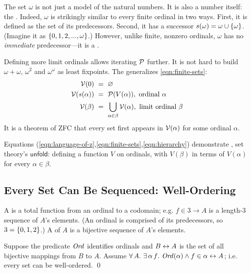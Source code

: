The set $\omega$ is not just a model of the natural numbers. It is also a number itself: the . Indeed, $\omega$ is strikingly similar to every finite ordinal in two ways. First, it is defined as the set of its predecessors. Second, it has a successor $s(\omega) = \omega \cup \{{\omega}\}$. (Imagine it as $\{{0,1,2,...,\omega}\}$.) However, unlike finite, nonzero ordinals, $\omega$ has no \emph{immediate} predecessor---it is a .

Defining more limit ordinals allows iterating $\mathcal{P}$ further. It is not hard to build $\omega + \omega$, $\omega^2$ and $\omega^\omega$ as least fixpoints. The  generalizes \eqref{eqn:finite-sets}:
\begin{equation}
\begin{aligned}
	\V(0) &\ =\ \emptyset \\
	\V(s(\alpha)) &\ =\ \powerset(V(\alpha)),\ \text{ordinal } \alpha \\
	\V(\beta) &\ =\ \bigcup_{\alpha \in \beta} \V(\alpha),\ \text{limit ordinal } \beta
\end{aligned}
\label{eqn:hierarchy}
\end{equation}
It is a theorem of ZFC that every set first appears in $\mathcal{V}(\alpha)$ for some ordinal $\alpha$.

Equations (\ref{eqn:language-of-z},\ref{eqn:finite-sets},\ref{eqn:hierarchy}) demonstrate , set theory's $\mathsf{unfold}$: defining a function $V$ on ordinals, with $V(\beta)$ in terms of $V(\alpha)$ for every $\alpha \in \beta$.

\subsection{Every Set Can Be Sequenced: Well-Ordering}

A  is a total function from an ordinal to a codomain; e.g. $f \in 3 \to A$ is a length-$3$ sequence of $A$'s elements. (An ordinal is comprised of its predecessors, so $3 = \{{0,1,2}\}$.) A  of $A$ is a bijective sequence of $A$'s elements.

\begin{axiom}
Suppose the predicate $\mathit{Ord}$ identifies ordinals and $B \leftrightarrow A$ is the set of all bijective mappings from $B$ to $A$. Assume $\forall\,{A}\ldotp\,\exists\,{\alpha\,f}\ldotp\,\mathit{Ord}(\alpha) \wedge f \in \alpha \leftrightarrow A$; i.e. every set can be well-ordered.
\qed
\end{axiom}

